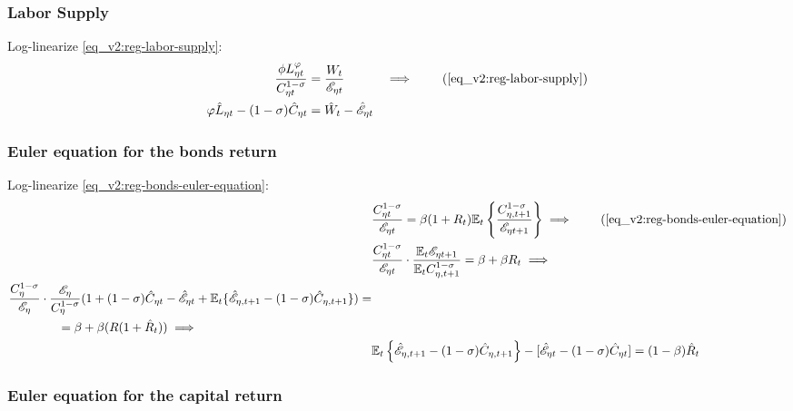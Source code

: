 \documentclass[../thesis.tex]{subfiles}
\begin{document}

\subsubsection*{Labor Supply}

Log-linearize \ref{eq_v2:reg-labor-supply}:
\begin{alignat}{2}
	\frac{\phi L_{\eta t}^{\varphi}}{C_{\eta t}^{1-\sigma}} &= \frac{W_t}{\te} &\implies \tag{\ref{eq_v2:reg-labor-supply}} \\
	\varphi \hat{L}_{\eta t} - (1 -\sigma) \hat{C}_{\eta t} &= \hat{W}_t - \hat{ \mathscr{E} }_{\eta t} & \label{eq_v2:reg-ll-labor-supply}
\end{alignat}


\subsubsection*{Euler equation for the bonds return}

Log-linearize \ref{eq_v2:reg-bonds-euler-equation}:
\begin{alignat}{2}
	& \frac{ C_{\eta t}^{1-\sigma}}{ \te} = \beta (1 + R_{t}) \E \left\{ \frac{ C_{\eta, t+1}^{1-\sigma}}{ \te[t+1]} \right\} \implies \tag{\ref{eq_v2:reg-bonds-euler-equation}}\\
	& \frac{ C_{\eta t}^{1-\sigma}}{\te} \cdot \frac{\E \te[t+1]}{\E C_{\eta, t+1}^{1-\sigma}} = \beta + \beta R_{t} \implies \nonumber \\
	\begin{split}
		& \frac{C_{\eta}^{1-\sigma}}{\te[]} \cdot \frac{\te[]}{C_{\eta}^{1-\sigma}} (1 + (1-\sigma) \hat{C}_{\eta t} - \hat{\mathscr{E}}_{\eta t} + \E \{ \hat{\mathscr{E}}_{\eta, t+1} - (1 -\sigma) \hat{C}_{\eta, t+1} \}) = \\ & \qquad \qquad = \beta + \beta (R(1 + \hat{R}_{t})) \implies
	\end{split} \nonumber \\
	& \E \left\{ \hat{\mathscr{E}}_{\eta, t+1} - (1 -\sigma) \hat{C}_{\eta, t+1} \right\} - [\hat{\mathscr{E}}_{\eta t} - (1 -\sigma) \hat{C}_{\eta t}] = (1 -\beta) \hat{R}_{t} \label{eq_v2:reg-ll-bonds-euler-equation}
\end{alignat}


\subsubsection*{Euler equation for the capital return}
\end{document}
